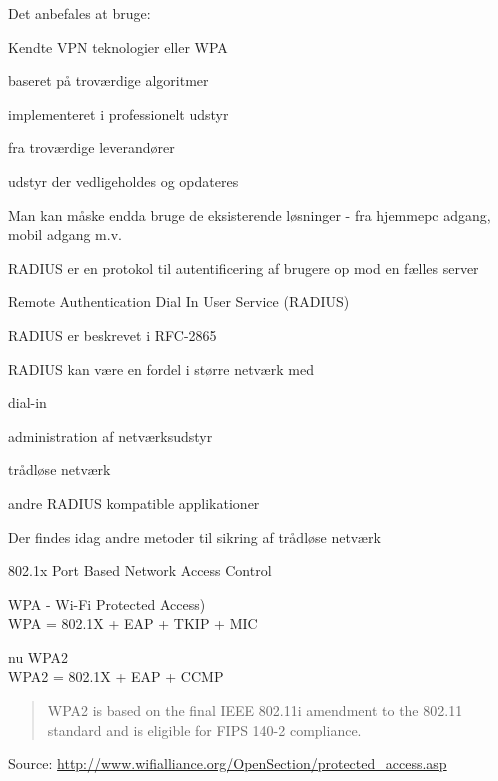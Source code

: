 \documentclass[Screen16to9,17pt]{foils}
\begin{document}
\begin{list1}
\item Det anbefales at bruge:
\item Kendte VPN teknologier eller WPA
\item baseret på troværdige algoritmer
\item implementeret i professionelt udstyr
\item fra troværdige leverandører
\item udstyr der vedligeholdes og opdateres
\item Man kan måske endda bruge de eksisterende løsninger - fra
  hjemmepc adgang, mobil adgang m.v.
\end{list1}


\begin{list1}
\item RADIUS er en protokol til autentificering af brugere op mod en
  fælles server
\item Remote Authentication Dial In User Service (RADIUS)
\item RADIUS er beskrevet i RFC-2865
\item RADIUS kan være en fordel i større netværk med
\begin{list2}
\item dial-in
\item administration af netværksudstyr
\item trådløse netværk
\item andre RADIUS kompatible applikationer
\end{list2}
\end{list1}

\begin{list1}
\item Der findes idag andre metoder til sikring af trådløse netværk
\item 802.1x Port Based Network Access Control
\item WPA - Wi-Fi Protected Access)\\
WPA = 802.1X + EAP + TKIP + MIC
\item nu WPA2\\
WPA2 = 802.1X + EAP + CCMP

\begin{quote}
WPA2 is based on the final IEEE 802.11i amendment to the 802.11
standard and is eligible for FIPS 140-2 compliance.
\end{quote}
\item Source:
\href{http://www.wifialliance.org/OpenSection/protected_access.asp}
{http://www.wifialliance.org/OpenSection/protected\_access.asp}
\end{list1}
\end{document}
